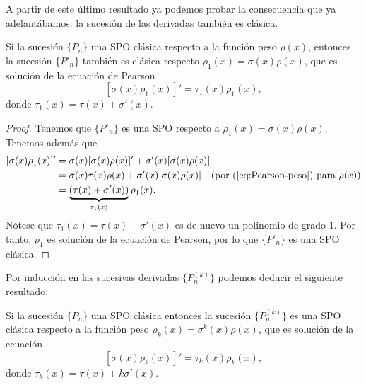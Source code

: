 A partir de este último resultado ya podemos probar la consecuencia que ya adelantábamos: la sucesión de las derivadas también es clásica.

\begin{corolario}
    \label{cor:derivadas-clasicas}
    Si la sucesión $\{P_n\}$ una SPO clásica respecto a la función peso $\rho(x)$, entonces la sucesión $\{P'_n\}$ también es clásica respecto $\rho_1(x)=\sigma(x)\rho(x)$, que es solución de la ecuación de Pearson
    \begin{equation}
        \label{eq:pearson-derivada}
        [\sigma(x)\rho_1(x)]' = \tau_1(x) \rho_1(x),
    \end{equation}
    donde $\tau_1(x)=\tau(x)+\sigma'(x)$.
\end{corolario}
\begin{proof}
    Tenemos que $\{P'_n\}$ es una SPO respecto a $\rho_1(x) = \sigma(x)\rho(x)$. Tenemos además que
    \begin{equation*}
        \begin{split}
            [\sigma(x)\rho_1(x)]' &= \sigma(x)[\sigma(x)\rho(x)]'+\sigma'(x)[\sigma(x)\rho(x)] \\
            &= \sigma(x)\tau(x)\rho(x) + \sigma'(x)[\sigma(x)\rho(x)] \  \ \ (\text{por (\ref{eq:Pearson-peso}) para }\rho(x)) \\
            &= \underbrace{(\tau(x)+\sigma'(x))}_{\tau_1(x)}\rho_1(x).
        \end{split}
    \end{equation*}
    Nótese que $\tau_1(x)=\tau(x)+\sigma'(x)$ es de nuevo un polinomio de grado $1$. Por tanto, $\rho_1$ es solución de la ecuación de Pearson, por lo que $\{P'_n\}$ es una SPO clásica.
\end{proof}

Por inducción en las sucesivas derivadas $\{P^{(k)}_n\}$ podemos deducir el siguiente resultado:

\begin{corolario}
    \label{cor:ort-derivadas}
    Si la sucesión $\{P_n\}$ una SPO clásica entonces la sucesión $\{P^{(k)}_n\}$ es una SPO clásica respecto a la función peso $\rho_k(x)=\sigma^k(x)\rho(x)$, que es solución de la ecuación
    \begin{equation}
        \label{eq:pearson-derivada-k}
        [\sigma(x)\rho_k(x)]' = \tau_k(x) \rho_k(x),
    \end{equation}
    donde $\tau_k(x)=\tau(x)+k\sigma'(x)$.
\end{corolario}

